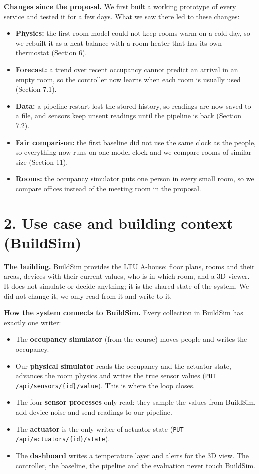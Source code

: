 \documentclass[11pt]{article}
\providecommand{\tightlist}{\setlength{\itemsep}{0pt}\setlength{\parskip}{0pt}}
\begin{document}
\textbf{Changes since the proposal.} We first built a working prototype of every service and
tested it for a few days. What we saw there led to these changes:
\begin{itemize}
\tightlist
\item \textbf{Physics:} the first room model could not keep rooms warm on a cold day, so we rebuilt
  it as a heat balance with a room heater that has its own thermostat (Section 6).
\item \textbf{Forecast:} a trend over recent occupancy cannot predict an arrival in an empty room, so
  the controller now learns when each room is usually used (Section 7.1).
\item \textbf{Data:} a pipeline restart lost the stored history, so readings are now saved to a file,
  and sensors keep unsent readings until the pipeline is back (Section 7.2).
\item \textbf{Fair comparison:} the first baseline did not use the same clock as the people, so
  everything now runs on one model clock and we compare rooms of similar size (Section 11).
\item \textbf{Rooms:} the occupancy simulator puts one person in every small room, so we compare
  offices instead of the meeting room in the proposal.
\end{itemize}

\section{2. Use case and building context (BuildSim)}\label{use-case}

\textbf{The building.} BuildSim provides the LTU A-house: floor plans, rooms and their areas,
devices with their current values, who is in which room, and a 3D viewer. It does not simulate
or decide anything; it is the shared state of the system. We did not change it, we only read
from it and write to it.

\textbf{How the system connects to BuildSim.} Every collection in BuildSim has exactly one writer:
\begin{itemize}
\tightlist
\item The \textbf{occupancy simulator} (from the course) moves people and writes the occupancy.
\item Our \textbf{physical simulator} reads the occupancy and the actuator state, advances the room
  physics and writes the true sensor values (\texttt{PUT /api/sensors/\{id\}/value}). This is
  where the loop closes.
\item The four \textbf{sensor processes} only read: they sample the values from BuildSim, add
  device noise and send readings to our pipeline.
\item The \textbf{actuator} is the only writer of actuator state
  (\texttt{PUT /api/actuators/\{id\}/state}).
\item The \textbf{dashboard} writes a temperature layer and alerts for the 3D view. The controller,
  the baseline, the pipeline and the evaluation never touch BuildSim.
\end{itemize}
\end{document}
